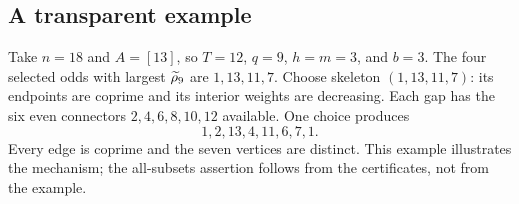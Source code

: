 \subsection{A transparent example}
Take $n=18$ and $A=[13]$, so $T=12$, $q=9$, $h=m=3$, and $b=3$. The four selected odds with largest $\widetilde\rho_9$ are $1,13,11,7$. Choose skeleton $(1,13,11,7)$: its endpoints are coprime and its interior weights are decreasing. Each gap has the six even connectors $2,4,6,8,10,12$ available. One choice produces
\[
 1,2,13,4,11,6,7,1.
\]
Every edge is coprime and the seven vertices are distinct. This example illustrates the mechanism; the all-subsets assertion follows from the certificates, not from the example.






